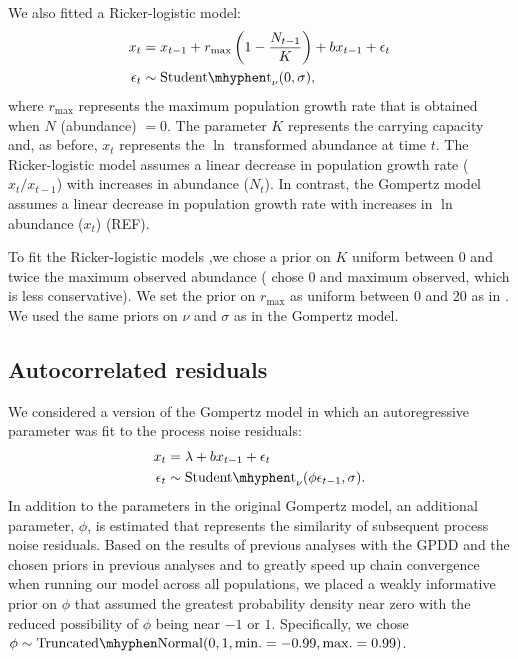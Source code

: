 \documentclass[11pt]{article}
\begin{document}
We also fitted a Ricker-logistic model:
\begin{align*}
x_t &= x_{t-1} + r_{\mathrm{max}}\left(1 - \frac{N_{t-1}}{K}\right) + b x_{t-1} + \epsilon_t\\
\epsilon_t &\sim \mathrm{Student\mhyphen t}_\nu(0, \sigma),
\end{align*}
\noindent
where  $r_\mathrm{max}$ represents the maximum population growth rate that is obtained when $N$ (abundance) $= 0$. The parameter $K$ represents the carrying capacity and, as before, $x_t$ represents the $\ln$ transformed abundance at time $t$. The Ricker-logistic model assumes a linear decrease in population growth rate ($x_t / x_{t-1}$) with increases in abundance ($N_t$). In contrast, the Gompertz model assumes a linear decrease in population growth rate with increases in $\ln$ abundance ($x_t$) (REF).

To fit the Ricker-logistic models ,we chose a prior on $K$ uniform between 0 and twice the maximum observed abundance (\citet{clark2010} chose 0 and maximum observed, which is less conservative). We set the prior on $r_\mathrm{max}$ as uniform between 0 and 20 as in \citet{clark2010}. We used the same priors on $\nu$ and $\sigma$ as in the Gompertz model.

\subsection{Autocorrelated residuals}

We considered a version of the Gompertz model in which an autoregressive parameter was fit to the process noise residuals:
\begin{align*}
x_t &= \lambda + b x_{t-1} + \epsilon_t\\
\epsilon_t &\sim \mathrm{Student\mhyphen t}_\nu(\phi \epsilon_{t-1}, \sigma).
\end{align*}
\noindent
In addition to the parameters in the original Gompertz model, an additional parameter, $\phi$, is estimated that represents the similarity of subsequent process noise residuals. Based on the results of previous analyses with the GPDD \citep[e.g.][]{connors2014} and the chosen priors in previous analyses \citep[e.g.][]{thorson2014a} and to greatly speed up chain convergence when running our model across all populations, we placed a weakly informative prior on $\phi$ that assumed the greatest probability density near zero with the reduced possibility of $\phi$ being near $-1$ or $1$. Specifically, we chose $\phi \sim \mathrm{Truncated\mhyphen Normal}(0, 1, \mathrm{min.} = -0.99, \mathrm{max.} = 0.99)$.
\end{document}
